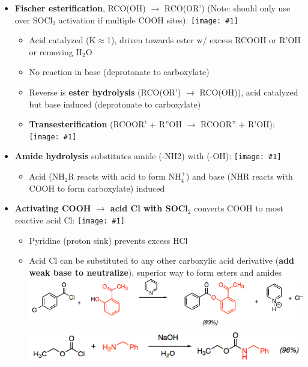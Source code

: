 \documentclass[10pt,landscape]{article}
\newcommand{\img}[1]{\texttt{[image: \#1]}}
\begin{document}
\begin{multicols*}{3}
\begin{scriptsize}
    \begin{itemize}
    \item \textbf{Fischer esterification}, RCO(OH) $\rightarrow$ RCO(OR') (Note: should
      only use over SOCl$_2$ activation if multiple COOH sites):
      \img{fischer.png}
      \begin{itemize}
      \item Acid catalyzed (K$\approx$1), driven towards ester w/ excess RCOOH or R'OH or
        removing H$_2$O
      \item No reaction in base (deprotonate to carboxylate)
      \item Reverse is \textbf{ester hydrolysis} (RCO(OR') $\rightarrow$ RCO(OH)), acid catalyzed but
        base induced (deprotonate to carboxylate)
      \item \textbf{Transesterification} (RCOOR' + R''OH $\rightarrow$ RCOOR'' + R'OH):
        \img{transester.png}
      \end{itemize}
    \item \textbf{Amide hydrolysis} substitutes amide (-NH2) with (-OH):
      \img{amidehydr.png}
      \begin{itemize}
      \item Acid (NH$_2$R reacts with acid to form NH$_4^+$) and base (NHR reacts with COOH to form
        carboxylate) induced
      \end{itemize}
    \item \textbf{Activating COOH $\rightarrow$ acid Cl with SOCl$_2$} converts COOH to most
      reactive acid Cl:
      \img{acidcl.png}
      \begin{itemize}
      \item Pyridine (proton sink) prevents excess HCl
      \item Acid Cl can be substituted to any other carboxylic acid derivative (\textbf{add weak
          base to neutralize}), superior way to form esters and amides
        \includegraphics[scale=0.33]{esterfromcocl.png}\\
        \includegraphics[scale=0.33]{amidefromcocl.png}

\end{itemize}
\end{itemize}
\end{scriptsize}
\end{multicols*}
\end{document}
